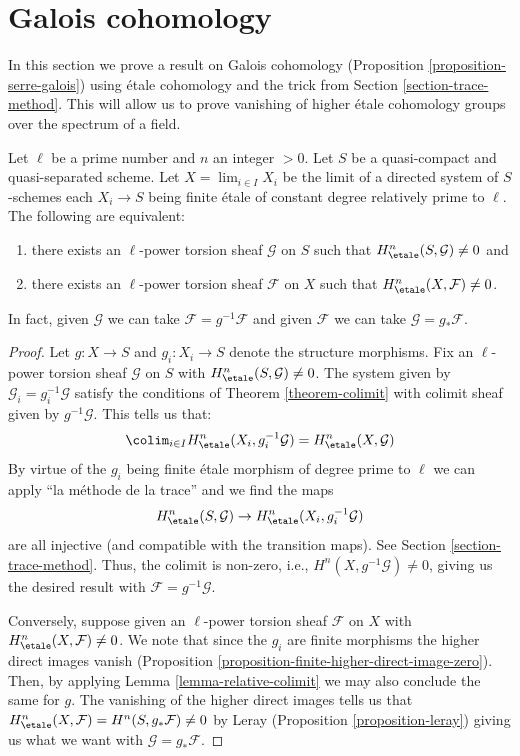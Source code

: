 \section{Galois cohomology}
\label{section-galois-cohomology}

\noindent
In this section we prove a result on Galois cohomology
(Proposition \ref{proposition-serre-galois})
using \'etale cohomology and the trick from
Section \ref{section-trace-method}.
This will allow us to prove vanishing of higher \'etale cohomology groups
over the spectrum of a field.

\begin{lemma}
\label{lemma-nonvanishing-inherited}
Let $\ell$ be a prime number and $n$ an integer $> 0$.
Let $S$ be a quasi-compact and quasi-separated scheme.
Let $X = \lim_{i \in I} X_i$ be the limit of a
directed system of $S$-schemes each $X_i \to S$
being finite \'etale of constant degree relatively prime to $\ell$.
The following are equivalent:
\begin{enumerate}
\item there exists an $\ell$-power torsion sheaf
$\mathcal{G}$ on $S$ such that $H_\etale^n(S, \mathcal{G}) \neq 0$ and
\item there exists an $\ell$-power torsion sheaf $\mathcal{F}$ on $X$
such that $H_\etale^n(X, \mathcal{F}) \neq 0$.
\end{enumerate}
In fact, given
$\mathcal{G}$ we can take $\mathcal{F} = g^{-1}\mathcal{F}$
and given
$\mathcal{F}$ we can take $\mathcal{G} = g_*\mathcal{F}$.
\end{lemma}

\begin{proof}
Let $g : X \to S$ and $g_i : X_i \to S$ denote the structure morphisms.
Fix an $\ell$-power torsion sheaf $\mathcal{G}$ on $S$
with $H^n_\etale(S, \mathcal{G}) \not = 0$.
The system given by $\mathcal{G}_i = g_i^{-1}\mathcal{G}$
satisfy the conditions of Theorem \ref{theorem-colimit}
with colimit sheaf given by $g^{-1}\mathcal{G}$. This tells 
us that:
$$
\colim_{i\in I} H^n_\etale(X_i, g_i^{-1}\mathcal{G}) =
H^n_\etale(X, \mathcal{G})
$$
By virtue of the $g_i$ being finite \'etale morphism of degree prime
to $\ell$ we can apply ``la m\'ethode de la trace'' and we find
the maps
$$
H^n_\etale(S, \mathcal{G}) \to H^n_\etale(X_i, g_i^{-1}\mathcal{G})
$$
are all injective (and compatible with the transition maps).
See Section \ref{section-trace-method}. Thus, the colimit is non-zero, i.e.,
$H^n(X,g^{-1}\mathcal{G}) \neq 0$, giving us the desired result with 
$\mathcal{F} = g^{-1}\mathcal{G}$.

\medskip\noindent
Conversely, suppose given an $\ell$-power torsion sheaf $\mathcal{F}$ on $X$
with $H^n_\etale(X, \mathcal{F}) \not = 0$. We note that since the $g_i$
are finite morphisms the higher direct images vanish
(Proposition \ref{proposition-finite-higher-direct-image-zero}).
Then, by applying Lemma \ref{lemma-relative-colimit}
we may also conclude the  same for $g$.
The vanishing of the higher direct images tells us that
$H^n_\etale(X, \mathcal{F}) = H^n(S, g_*\mathcal{F}) \neq 0$
by Leray (Proposition \ref{proposition-leray})
giving us what we want with $\mathcal{G} = g_*\mathcal{F}$.
\end{proof}

